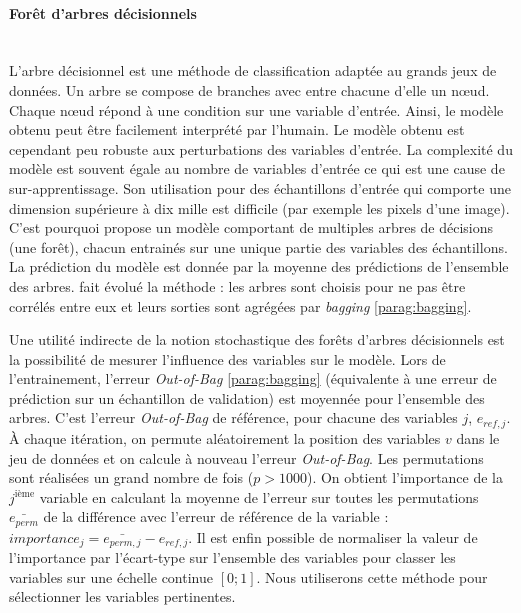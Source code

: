 \paragraph{Forêt d'arbres décisionnels}\mbox{\label{parag:random_forests}} \\
L'arbre décisionnel est une méthode de classification adaptée au grands jeux de données.
Un arbre se compose de branches avec entre chacune d'elle un nœud.
Chaque nœud répond à une condition sur une variable d'entrée.
Ainsi, le modèle obtenu peut être facilement interprété par l'humain.
Le modèle obtenu est cependant peu robuste aux perturbations des variables d'entrée.
La complexité du modèle est souvent égale au nombre de variables d'entrée ce qui est une cause de sur-apprentissage.
Son utilisation pour des échantillons d'entrée qui comporte une dimension supérieure à dix mille est difficile (par exemple les pixels d'une image).
C'est pourquoi \cite{ho_random_1995, ho_random_1998} propose un modèle comportant de multiples arbres de décisions (une forêt), chacun entrainés sur une unique partie des variables des échantillons.
La prédiction du modèle est donnée par la moyenne des prédictions de l'ensemble des arbres. 
\cite{breiman_random_2001} fait évolué la méthode : les arbres sont choisis pour ne pas être corrélés entre eux et leurs sorties sont agrégées par \textit{bagging} \ref{parag:bagging}.

Une utilité indirecte de la notion stochastique des forêts d'arbres décisionnels est la possibilité de mesurer l'influence des variables sur le modèle.
Lors de l'entrainement, l'erreur \textit{Out-of-Bag} \ref{parag:bagging} (équivalente à une erreur de prédiction sur un échantillon de validation) est moyennée pour l'ensemble des arbres.
C'est l'erreur \textit{Out-of-Bag} de référence, pour chacune des variables $j$, $e_{ref, j}$.
À chaque itération, on permute aléatoirement la position des variables $v$ dans le jeu de données et on calcule à nouveau l'erreur \textit{Out-of-Bag}.
Les permutations sont réalisées un grand nombre de fois ($p > 1000$).
On obtient l'importance de la $j^{\text{ième}}$ variable en calculant la moyenne de l'erreur sur toutes les permutations $\bar{e_{perm}}$ de la différence avec l'erreur de référence de la variable : $importance_{j} = \bar{e_{perm, j}} - e_{ref, j}$.
Il est enfin possible de normaliser la valeur de l'importance par l'écart-type sur l'ensemble des variables pour classer les variables sur une échelle continue $[0 ; 1]$.
Nous utiliserons cette méthode pour sélectionner les variables pertinentes.

